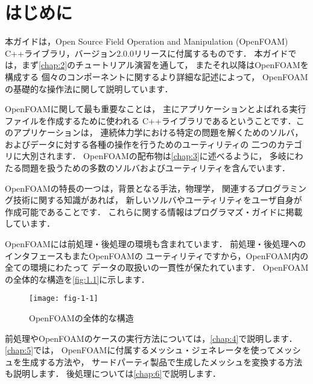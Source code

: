 \chapter{はじめに}
\label{chap:1}
本ガイドは，Open Source Field Operation and Manipulation
(OpenFOAM) C++ライブラリ，バージョン2.0.0リリースに付属するものです．
本ガイドでは，まず\autoref{chap:2}のチュートリアル演習を通して，
またそれ以降はOpenFOAMを構成する
個々のコンポーネントに関するより詳細な記述によって，
OpenFOAMの基礎的な操作法に関して説明しています．

OpenFOAMに関して最も重要なことは，
主にアプリケーションとよばれる実行ファイルを作成するために使われる
C++ライブラリであるということです．このアプリケーションは，
連続体力学における特定の問題を解くためのソルバ，
およびデータに対する各種の操作を行うためのユーティリティの
二つのカテゴリに大別されます．
OpenFOAMの配布物は\autoref{chap:3}に述べるように，
多岐にわたる問題を扱うための多数のソルバおよびユーティリティを含んでいます．

OpenFOAMの特長の一つは，背景となる手法，物理学，
関連するプログラミング技術に関する知識があれば，
新しいソルバやユーティリティをユーザ自身が作成可能であることです．
これらに関する情報はプログラマズ・ガイドに掲載しています．

OpenFOAMには前処理・後処理の環境も含まれています．
前処理・後処理へのインタフェースもまたOpenFOAMの
ユーティリティですから，OpenFOAM内の全ての環境にわたって
データの取扱いの一貫性が保たれています．
OpenFOAMの全体的な構造を\autoref{fig:1.1}に示します．


\begin{figure}[ht]
 \texttt{[image: fig-1-1]}
 \caption{OpenFOAMの全体的な構造}
 \label{fig:1.1}
\end{figure}


前処理やOpenFOAMのケースの実行方法については，\autoref{chap:4}で説明します．
\autoref{chap:5}では，
OpenFOAMに付属するメッシュ・ジェネレータを使ってメッシュを生成する方法や，
サードパーティ製品で生成したメッシュを変換する方法も説明します．
後処理については\autoref{chap:6}で説明します．

